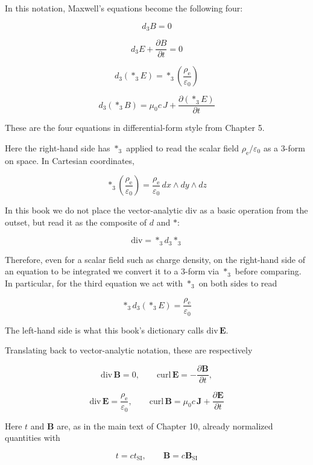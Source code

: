 \documentclass[a4paper,12pt,openany]{book}
\begin{document}
In this notation, Maxwell's equations become the following four:

\[
d_3B=0
\]

\[
d_3E+\frac{\partial B}{\partial t}=0
\]

\[
d_3(\ast_3E)=\ast_3\left(\frac{\rho_{\mathrm e}}{\varepsilon_0}\right)
\]

\[
d_3(\ast_3B)=\mu_0 c\,J+\frac{\partial(\ast_3E)}{\partial t}
\]

These are the four equations in differential-form style from Chapter 5.

Here the right-hand side has \(\ast_3\) applied to read the scalar field
\(\rho_{\mathrm e}/\varepsilon_0\) as a \(3\)-form on space. In
Cartesian coordinates,

\[
\ast_3\left(\frac{\rho_{\mathrm e}}{\varepsilon_0}\right)=\frac{\rho_{\mathrm e}}{\varepsilon_0}\,dx\wedge dy\wedge dz
\]

In this book we do not place the vector-analytic \(\mathrm{div}\) as a
basic operation from the outset, but read it as the composite of \(d\)
and \(\ast\):

\[
\mathrm{div}=\ast_3 d_3\ast_3
\]

Therefore, even for a scalar field such as charge density, on the
right-hand side of an equation to be integrated we convert it to a
\(3\)-form via \(\ast_3\) before comparing. In particular, for the third
equation we act with \(\ast_3\) on both sides to read

\[
\ast_3d_3(\ast_3E)=\frac{\rho_{\mathrm e}}{\varepsilon_0}
\]

The left-hand side is what this book's dictionary calls
\(\mathrm{div}\,\mathbf E\).

Translating back to vector-analytic notation, these are respectively

\[
\mathrm{div}\,\mathbf B=0,
\qquad
\mathrm{curl}\,\mathbf E=-\frac{\partial\mathbf B}{\partial t},
\]

\[
\mathrm{div}\,\mathbf E=\frac{\rho_{\mathrm e}}{\varepsilon_0},
\qquad
\mathrm{curl}\,\mathbf B=\mu_0 c\,\mathbf J+\frac{\partial\mathbf E}{\partial t}
\]

Here \(t\) and \(\mathbf B\) are, as in the main text of Chapter 10,
already normalized quantities with

\[
t=ct_{\mathrm{SI}},
\qquad
\mathbf B=c\mathbf B_{\mathrm{SI}}
\]
\end{document}
